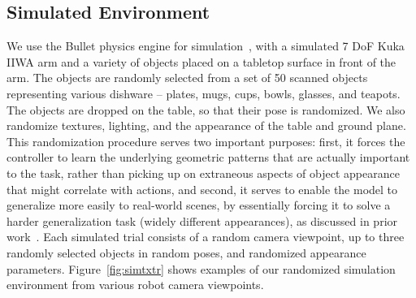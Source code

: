 \documentclass[10pt,twocolumn,letterpaper]{article}
\begin{document}
\subsection{Simulated Environment}\label{sec:sim_env_train}
We use the Bullet physics engine for simulation~\cite{coumans2017}, with a simulated 7 DoF Kuka IIWA arm and a variety of objects placed on a tabletop surface in front of the arm. The objects are randomly selected from a set of 50 scanned objects representing various dishware -- plates, mugs, cups, bowls, glasses, and teapots. The objects are dropped on the table, so that their pose is randomized. We also randomize textures, lighting, and the appearance of the table and ground plane. This randomization procedure serves two important purposes: first, it forces the controller to learn the underlying geometric patterns that are actually important to the task, rather than picking up on extraneous aspects of object appearance that might correlate with actions, and second, it serves to enable the model to generalize more easily to real-world scenes, by essentially forcing it to solve a harder generalization task (widely different appearances), as discussed in prior work~\cite{sadeghi2017cadrl}. Each simulated trial consists of a random camera viewpoint, up to three randomly selected objects in random poses, and randomized appearance parameters. Figure~\ref{fig:simtxtr} shows examples of our randomized simulation environment from various robot camera viewpoints. 
\end{document}
